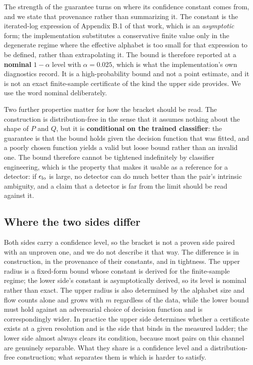 The strength of the guarantee turns on where its confidence constant comes from,
and we state that provenance rather than summarizing it. The constant is the
iterated-log expression of Appendix B.1 of that work, which is an
\emph{asymptotic} form; the implementation substitutes a conservative finite
value only in the degenerate regime where the effective alphabet is too small
for that expression to be defined, rather than extrapolating it. The bound is
therefore reported at a \textbf{nominal} $1-\alpha$ level with
$\alpha = 0.025$, which is what the implementation's own diagnostics record. It
is a high-probability bound and not a point estimate, and it is not an exact
finite-sample certificate of the kind the upper side provides. We use the word
nominal deliberately.

Two further properties matter for how the bracket should be read. The
construction is distribution-free in the sense that it assumes nothing about the
shape of $P$ and $Q$, but it is \textbf{conditional on the trained classifier}:
the guarantee is that the bound holds given the decision function that was
fitted, and a poorly chosen function yields a valid but loose bound rather than
an invalid one. The bound therefore cannot be tightened indefinitely by
classifier engineering, which is the property that makes it usable as a
reference for a detector: if $\epsilon_{\mathrm{lo}}$ is large, no detector can do much better
than the pair's intrinsic ambiguity, and a claim that a detector is far from the
limit should be read against it.

\subsection{Where the two sides differ}
\label{sec:design/asymmetry}

Both sides carry a confidence level, so the bracket is not a proven side paired
with an unproven one, and we do not describe it that way. The difference is in
construction, in the provenance of their constants, and in tightness. The upper
radius is a fixed-form bound whose constant is derived for the finite-sample
regime; the lower side's constant is asymptotically derived, so its level is
nominal rather than exact. The upper radius is also determined by the alphabet
size and flow counts alone and grows with $m$ regardless of the data, while the
lower bound must hold against an adversarial choice of decision function and is
correspondingly wider. In practice the upper side determines whether a
certificate exists at a given resolution and is the side that binds in the
measured ladder; the lower side almost always clears its condition, because most
pairs on this channel are genuinely separable. What they share is a confidence
level and a distribution-free construction; what separates them is which is
harder to satisfy.

